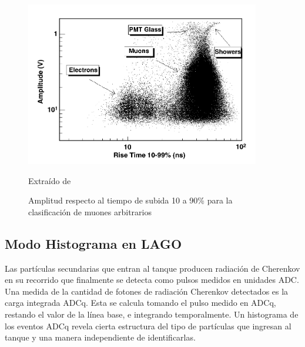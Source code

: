 \documentclass{book}
\begin{document}
\begin{figure}[h] %
\begin{center}
 \includegraphics[width =0.8\linewidth]{RiseTimeAmpSalazar.png}
 
 Extra\'ido de \citep{Salazar}
\caption{Amplitud respecto al tiempo de subida 10 a 90\% para la clasificaci\'on de muones arbitrarios}
\end{center}
\end{figure}

\subsection{Modo Histograma en LAGO}
Las part\'iculas secundarias que entran al tanque producen radiaci\'on de Cherenkov en su recorrido que finalmente se detecta como pulsos medidos en unidades ADC. Una medida de la cantidad de fotones de radiaci\'on Cherenkov detectados es la carga integrada ADCq. Esta se calcula tomando el pulso medido en ADCq, restando el valor de la l\'inea base, e integrando temporalmente. Un histograma de los eventos ADCq revela cierta estructura del tipo de part\'iculas que ingresan al tanque y una manera independiente de identificarlas. \citep{PEREZ}
\end{document}
